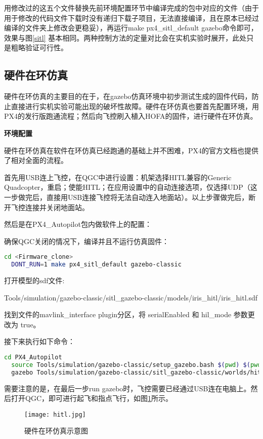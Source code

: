用修改过的这五个文件替换先前环境配置环节中编译完成的包中对应的文件（由于用于修改的代码文件下载时没有递归下载子项目，无法直接编译，且在原本已经过编译的文件夹上修改会更稳妥），再运行make px4\_sitl\_default gazebo命令即可，效果与图\ref{sitl} 基本相同。两种控制方法的定量对比会在实机实验时展开，此处只是粗略验证可行性。

\subsection{硬件在环仿真}
硬件在环仿真的主要目的在于，在gazebo仿真环境中初步测试生成的固件代码，防止直接进行实机实验可能出现的破坏性故障。硬件在环仿真也要首先配置环境，用PX4的发行版跑通流程；然后向飞控刷入植入HOFA的固件，进行硬件在环仿真。

\textbf{环境配置}

硬件在环仿真在软件在环仿真已经跑通的基础上并不困难，PX4的官方文档也提供了相对全面的流程\cite{px4hitl}。

首先用USB连上飞控，在QGC中进行设置：机架选择HITL兼容的Generic Quadcopter，重启；使能HITL；在应用设置中的自动连接选项，仅选择UDP（这一步做完后，直接用USB连接飞控将无法自动连入地面站）。以上步骤做完后，断开飞控连接并关闭地面站。

然后是在PX4\_Autopilot包内做软件上的配置\cite{px4hitl}：

确保QGC关闭的情况下，编译并且不运行仿真固件：
\begin{lstlisting}[language=Bash, basicstyle=\footnotesize, linewidth=\linewidth, breaklines=true]
  cd <Firmware_clone>
  DONT_RUN=1 make px4_sitl_default gazebo-classic
\end{lstlisting}

打开模型的sdf文件:

Tools/simulation/gazebo-classic/sitl\_gazebo-classic/models/iris\_hitl/iris\_hitl.sdf

找到文件的mavlink\_interface plugin分区，将 serialEnabled 和 hil\_mode 参数更改为 true。

接下来执行如下命令：

\begin{lstlisting}[language=Bash, basicstyle=\footnotesize, linewidth=\linewidth, breaklines=true]
  cd PX4_Autopilot
  source Tools/simulation/gazebo-classic/setup_gazebo.bash $(pwd) $(pwd)/build/px4_sitl_default
  gazebo Tools/simulation/gazebo-classic/sitl_gazebo-classic/worlds/hitl_iris.world
\end{lstlisting}


需要注意的是，在最后一步run gazebo时，飞控需要已经通过USB连在电脑上。然后打开QGC，即可进行起飞和指点飞行，如图\ref{hitl}所示。
\begin{figure}[!h]
  \centering
  \texttt{[image: hitl.jpg]}
  \caption{硬件在环仿真示意图}
  \label{hitl}
\end{figure}

